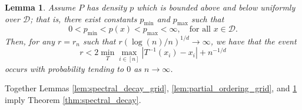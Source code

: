 \documentclass{article}
\newcommand{\abs}[1]{\left \lvert #1 \right \rvert}
\newcommand{\1}{\mathbf{1}}
\newcommand{\D}{\mathcal{D}}
\theoremstyle{alden}
\theoremstyle{aldenthm}
\newtheorem{lemma}{Lemma}
\theoremstyle{definition}
\theoremstyle{remark}
\begin{document}
\begin{lemma}
	\label{lem:matching_distance}
	Assume $P$ has density $p$ which is bounded above and below uniformly over $\D$; that is, there exist constants $p_{\min}$ and $p_{\max}$ such that
	\begin{equation*}
	0 < p_{\min} < p(x) < p_{\max} < \infty, \quad \text{for all $x \in \mathcal{D}$}.
	\end{equation*}
	Then, for any $r = r_n$ such that $r(\log(n)/n)^{1/d} \to \infty$, we have that the event
	\begin{equation*}
	r < 2 \min_{T} \max_{i \in [n]} \abs{T^{-1}(x_i) - x_i} + n^{-1/d}
	\end{equation*}
	occurs with probability tending to $0$ as $n \to \infty$. 
\end{lemma}

Together Lemmas \ref{lem:spectral_decay_grid}, \ref{lem:partial_ordering_grid}, and \ref{lem:matching_distance} imply Theorem \ref{thm:spectral_decay}.
\end{document}
